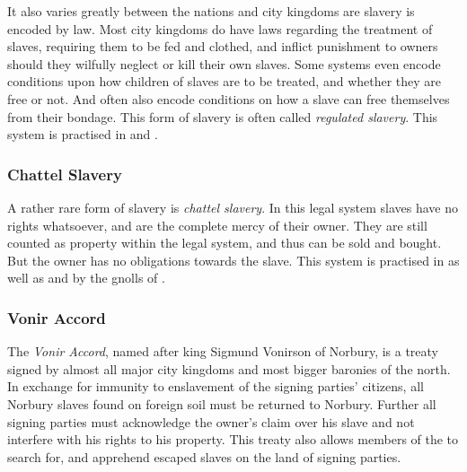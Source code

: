 It also varies greatly between the nations and city kingdoms are slavery
is encoded by law. Most city kingdoms do have laws regarding the treatment
of slaves, requiring them to be fed and clothed, and inflict punishment
to owners should they wilfully neglect or kill their own slaves. Some systems
even encode conditions upon how children of slaves are to be treated, and
whether they are free or not. And often also encode conditions on how a
slave can free themselves from their bondage. This form of slavery is often
called \emph{regulated slavery}. This system is practised in
 and .

\subsubsection{Chattel Slavery}
\label{sec:Chattel Slavery}

A rather rare form of slavery is \emph{chattel slavery}. In this legal system
slaves have no rights whatsoever, and are the complete mercy of their
owner. They are still counted as property within the legal system, and thus
can be sold and bought. But the owner has no obligations towards the slave.
This system is practised in  as well as
 and by the gnolls of .

\subsubsection{Vonir Accord}
\label{sec:Vonir Accord}

The \emph{Vonir Accord}, named after king Sigmund Vonirson of Norbury, is a
treaty signed by almost all major city kingdoms and most bigger baronies of
the north. In exchange for immunity to enslavement of the signing parties'
citizens, all Norbury slaves found on foreign soil must be returned to
Norbury. Further all signing parties must acknowledge the owner's claim over
his slave and not interfere with his rights to his property. This treaty
also allows members of the  to search for, and
apprehend escaped slaves on the land of signing parties.
